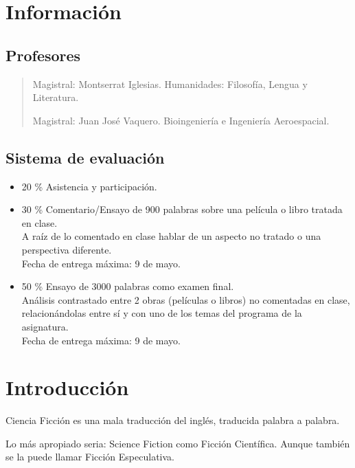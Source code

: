 \documentclass[12pt, twoside, openright]{report} %
\begin{document}



\chapter{Información}\label{ch:informacion}
\section{Profesores}\label{sec:profesores}
\begin{quote}
	Magistral: Montserrat Iglesias. Humanidades: Filosofía, Lengua y Literatura.

	Magistral: Juan José Vaquero. Bioingeniería e Ingeniería Aeroespacial.
\end{quote}

\section{Sistema de evaluación}\label{sec:sistema-de-evaluación}
\begin{itemize}
	\item 20 \% Asistencia y participación.
	\item 30 \% Comentario/Ensayo de 900 palabras sobre una película o libro tratada en clase. \\ A raíz de lo comentado en clase hablar de un aspecto no tratado o una perspectiva diferente. \\ Fecha de entrega máxima: 9 de mayo.
	\item 50 \% Ensayo de 3000 palabras como examen final. \\ Análisis contrastado entre 2 obras (películas o libros) no comentadas en clase, relacionándolas entre sí y con uno de los temas del programa de la asignatura. \\ Fecha de entrega máxima: 9 de mayo.
\end{itemize}

\chapter{Introducción}\label{ch:introduccion}
Ciencia Ficción es una mala traducción del inglés, traducida palabra a palabra.

Lo más apropiado seria: Science Fiction como Ficción Científica. Aunque también se la puede llamar Ficción Especulativa.
\end{document}
